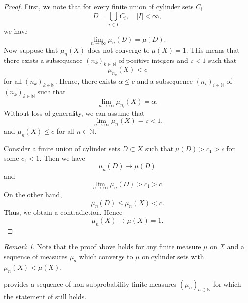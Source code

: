 \documentclass[11pt,reqno]{amsart}
\theoremstyle{definition}
\theoremstyle{remark}
\newtheorem{remark}[definition]{Remark}
\theoremstyle{plain}
\newcommand{\N}{\mathbb N}
\numberwithin{equation}{section}
\begin{document}
\begin{proof}
First, we note that for every finite union of cylinder sets $C_i$
$$
D = \bigcup_{i \in I} C_i, \quad |I| < \infty,
$$ 
we have
\[
\lim_{n \rightarrow \infty}\mu_n(D) = \mu(D).
\]
Now suppose that $\mu_n(X)$ does not converge to $\mu(X) = 1$. 
This means that there exists a subsequence $(n_k)_{k \in \N}$ of positive integers and $c < 1$ such that 
$$
\mu_{n_k}(X) < c
$$
for all $(n_k)_{k \in \N}$. Hence, there exists $\alpha \leq c$ and a subsequence $(n_i)_{i \in \N}$ of $(n_k)_{k \in \N}$ such that
\[
\lim_{n \rightarrow \infty}\mu_{n_i}(X) = \alpha.
\] {Without loss of generality, we can assume that 
\[
\lim_{n \rightarrow \infty}\mu_{n}(X) = c < 1.
\]
and $\mu_n(X) \leq c$ for all $n \in \N$.}

Consider a finite union of cylinder sets $D \subset X$
such that $\mu(D) > c_1 > c$ for some $c_1 < 1$. Then we have 
$$
\mu_n(D) \rightarrow \mu(D)
$$
and
$$
\lim_{n \rightarrow \infty} \mu_n(D) > c_1 > c.
$$
On the other hand, 
$$
\mu_n(D) \leq \mu_n(X) < c.
$$
Thus, we obtain a contradiction. Hence 
$$
\mu_n(X) \rightarrow \mu(X) = 1.
$$
\end{proof}

\begin{remark} %
Note that the proof above holds for any finite measure $\mu$ on $X$ and a sequence of measures $\mu_n$ which converge to $\mu$ on cylinder sets with $\mu_n(X) < \mu(X)$. 
\end{remark}

 provides a sequence of non-subprobability finite measures $(\mu_n)_{n \in \N}$ for which the statement of  still holds.
\end{document}
